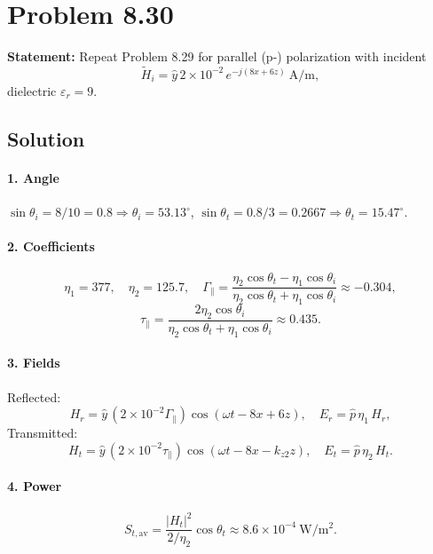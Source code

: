\section*{Problem 8.30}
\textbf{Statement:} Repeat Problem 8.29 for parallel (p-) polarization with incident
\[
\tilde H_i = \hat y\,2\times10^{-2}\,e^{-j(8x + 6z)}\ \mathrm{A/m},
\]
dielectric $\varepsilon_r=9$.

\subsection*{Solution}
\paragraph{1. Angle}
$\sin\theta_i=8/10=0.8\Rightarrow \theta_i=53.13^\circ$,  
$\sin\theta_t=0.8/3=0.2667\Rightarrow \theta_t=15.47^\circ$.

\paragraph{2. Coefficients}
\[
\eta_1=377,\quad\eta_2=125.7,\quad
\Gamma_\parallel=\frac{\eta_2\cos\theta_t - \eta_1\cos\theta_i}{\eta_2\cos\theta_t + \eta_1\cos\theta_i}\approx -0.304,
\]
\[
\tau_\parallel = \frac{2\eta_2\cos\theta_i}{\eta_2\cos\theta_t + \eta_1\cos\theta_i}\approx 0.435.
\]

\paragraph{3. Fields}
Reflected:
\[
H_r = \hat y\,(2\times10^{-2}\Gamma_\parallel)\cos(\omega t - 8x + 6z),
\quad
E_r = \hat p\,\eta_1\,H_r,
\]
Transmitted:
\[
H_t = \hat y\,(2\times10^{-2}\tau_\parallel)\cos(\omega t - 8x - k_{z2} z),
\quad
E_t = \hat p\,\eta_2\,H_t.
\]

\paragraph{4. Power}
\[
S_{t,\mathrm{av}}
= \frac{|H_t|^2}{2/\eta_2}\cos\theta_t
\approx 8.6\times10^{-4}\ \mathrm{W/m^2}.
\]
